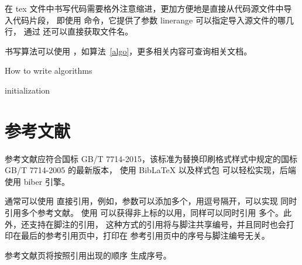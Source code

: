 在 tex 文件中书写代码需要格外注意缩进，更加方便地是直接从代码源文件中导入代码片段，
即使用  命令，它提供了参数 linerange 可以指定导入源文件的哪几行，
通过  还可以直接获取文件名。



书写算法可以使用 ，如算法~\ref{algo}，更多相关内容可查询相关文档。

\begin{algorithm}[!htbp]
    \SetAlgoLined\normalem\linespread{1.2}\small
    \caption{How to write algorithms}\label{algo}
    initialization\;
\end{algorithm}

\section{参考文献}

参考文献应符合国标 GB/T 7714-2015，该标准为替换印刷格式样式中规定的国标 GB/T 7714-2005 的最新版本，
使用 Bib\LaTeX{} 以及样式包  可以轻松实现，后端使用 biber 引擎。

通常可以使用  直接引用，例如\cite{lamport1986document}，参数可以添加多个，用逗号隔开，可以实现
同时引用多个参考文献\cite{chen2005zhulu,chu2004tushu,stamerjohanns2009mathml}。
使用  可以获得非上标的以用\parencite{betts2005aging}，同样可以同时引用
多个\parencite{bravo1990comparative,hls2012jinji,niu2013zonghe}。此外，还支持在脚注的引用，
这种方式的引用将与脚注共享编号，并且同时也会打印在最后的参考引用页中，打印在
参考引用页中的序号与脚注编号无关。

参考文献页\cite{yuan2012lana,yuan2012lanb,yuan2012lanc}将按照引用出现的顺序
生成序号\parencite{Bohan1928,Dubrovin1906}。
